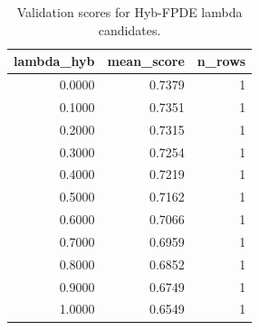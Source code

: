 \begin{table}[t]
\caption{Validation scores for Hyb-FPDE lambda candidates.}
\label{tab:lambda_distribution_computed}
\centering
\begin{tabular}{rrr}
\toprule
lambda\_hyb & mean\_score & n\_rows \\
\midrule
0.0000 & 0.7379 & 1 \\
0.1000 & 0.7351 & 1 \\
0.2000 & 0.7315 & 1 \\
0.3000 & 0.7254 & 1 \\
0.4000 & 0.7219 & 1 \\
0.5000 & 0.7162 & 1 \\
0.6000 & 0.7066 & 1 \\
0.7000 & 0.6959 & 1 \\
0.8000 & 0.6852 & 1 \\
0.9000 & 0.6749 & 1 \\
1.0000 & 0.6549 & 1 \\
\bottomrule
\end{tabular}

\end{table}
